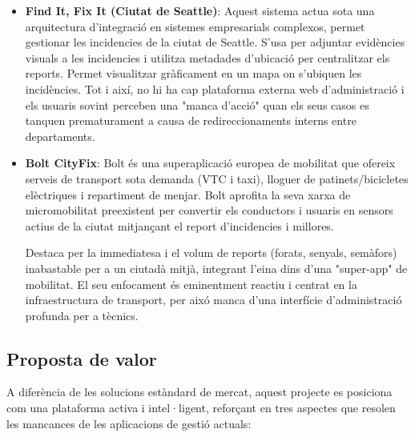 \documentclass[10pt,a4paper,twocolumn,twoside]{article}
\begin{document}
		\begin{itemize}
			\item \textbf{Find It, Fix It (Ciutat de Seattle)}\cite{10}: Aquest sistema actua sota una arquitectura d’integració en sistemes empresarials complexos, permet gestionar les incidencies de la ciutat de Seattle. S'usa per adjuntar evidències visuals a les incidencies i utilitza metadades d'ubicació per centralitzar els reports. Permet visualitzar gràficament en un mapa on s'ubiquen les incidències. 
			Tot i així, no hi ha cap plataforma externa web d'administració i els usuaris sovint perceben una "manca d'acció" quan els seus casos es tanquen prematurament a causa de redireccionaments interns entre departaments.
			
			\item \textbf{Bolt CityFix}\cite{11}: Bolt és una superaplicació europea de mobilitat que ofereix serveis de transport sota demanda (VTC i taxi), lloguer de patinets/bicicletes elèctriques i repartiment de menjar. Bolt aprofita la seva xarxa de micromobilitat preexistent per convertir els conductors i usuaris en sensors actius de la ciutat mitjançant el report d'incidencies i millores.
			
			Destaca per la immediatesa i el volum de reports (forats, senyals, semàfors) inabastable per a un ciutadà mitjà, integrant l'eina dins d'una "super-app" de mobilitat. 
			El seu enfocament és eminentment reactiu i centrat en la infraestructura de transport, per aixó manca d'una interfície d'administració profunda per a tècnics.
		\end{itemize}
		
		\subsection{Proposta de valor}
		A diferència de les solucions estàndard de mercat, aquest projecte es posiciona com una plataforma activa i intel·ligent, reforçant en tres aspectes que resolen les mancances de les aplicacions de gestió actuals:
		
\end{document}
